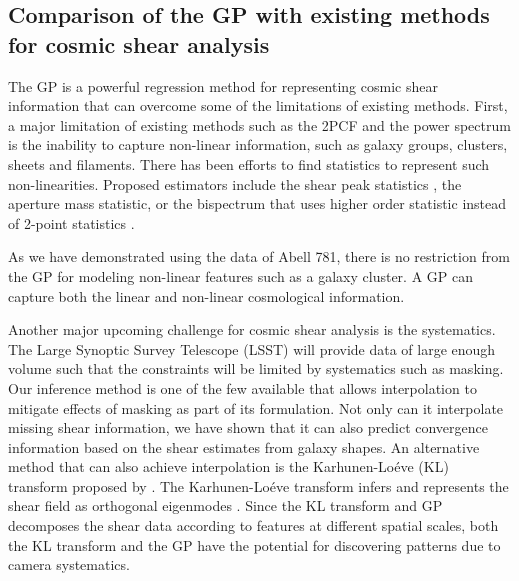 \subsection{Comparison of the GP with existing methods for cosmic shear analysis}  
The GP is a powerful regression method for representing
cosmic shear information that can overcome some of the limitations of existing
methods. First, a major limitation of existing methods such as the 2PCF and the power
spectrum is the inability to capture non-linear information, 
such as galaxy groups, clusters, sheets and filaments.
There has been efforts to find statistics to represent such non-linearities.
Proposed estimators include the shear peak statistics 
\citep{Bard2014}, the aperture mass statistic, 
or the bispectrum that uses higher order statistic  
instead of 2-point statistics \citep{Kayo2012}.

As we have demonstrated using the data of Abell 781, 
there is no restriction from the
GP for modeling non-linear features such as a galaxy cluster. 
A GP can capture both the linear and non-linear cosmological information. 

Another major upcoming challenge for cosmic shear analysis is the systematics. 
The Large Synoptic Survey Telescope (LSST) will
provide data of large enough volume such that the
constraints will be limited by systematics such as masking. 
Our inference method is one of the few available that allows interpolation 
to mitigate effects of masking as part of its formulation. Not only can it interpolate
missing shear information, we have shown that it can also predict convergence
information based on the shear estimates from galaxy shapes.
An alternative method that can also achieve interpolation 
is the Karhunen-Lo\'{e}ve (KL) transform proposed by \cite{VanderPlas2012a}. 
The Karhunen-Lo\'{e}ve transform infers and represents the shear field as 
orthogonal eigenmodes \citep{VanderPlas2012a}. 
Since the KL transform and GP decomposes the shear data according to features
at different spatial scales, both the KL transform and the GP have the potential 
for discovering patterns due to camera systematics.  


